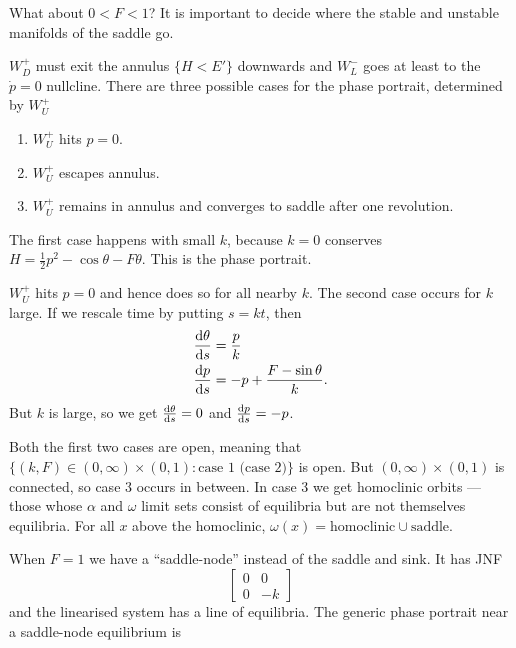 \documentclass{notes}
\theoremstyle{plain}
\begin{document}
What about $0 < F < 1$?  It is important to decide where the stable and
unstable manifolds of the saddle go.

\vspace*{2in}

$W_D^+$ must exit the annulus $\{ H < E' \}$ downwards and $W_L^-$
goes at least to the $\dot{p} = 0$ nullcline.  There are three possible
cases for the phase portrait, determined by $W_U^+$

\begin{enumerate}
\item $W_U^+$ hits $p=0$.
\item $W_U^+$ escapes annulus.
\item $W_U^+$ remains in annulus and converges to saddle after one revolution.
\end{enumerate}

\newpage

The first case happens with small $k$, because $k=0$ conserves
$H= \frac{1}{2} p^2 - \cos \theta -F \theta$.  This is the phase portrait.
\vspace{2in}

$W_U^+$ hits $p=0$ and hence does so for all nearby $k$.  The
second case occurs for $k$ large.  If we rescale time by putting $s = k t$,
then
\begin{align*}
\frac{\mathrm{d}\theta}{\mathrm{d} s} &= \frac{p}{k} \\
\frac{\mathrm{d} p}{\mathrm{d} s} &= -p + \frac{F - \sin \theta}{k}.
\end{align*}
But $k$ is large, so we get $\frac{\mathrm{d}\theta}{\mathrm{d} s} = 0$ and
$\frac{\mathrm{d} p}{\mathrm{d} s} = -p$.

Both the first two cases are open, meaning that
$\{ (k,F) \in (0,\infty) \times (0,1) : \text{case 1 (case 2)}\}$ is open.  But
$(0,\infty) \times (0,1)$ is connected, so case 3 occurs in between.  In case 3
we get homoclinic orbits --- those whose $\alpha$ and $\omega$ limit sets
consist of equilibria but are not themselves equilibria.  For all $x$ above
the homoclinic, $\omega(x) = \text{homoclinic} \cup \text{saddle}$.

When $F = 1$ we have a ``saddle-node'' instead of the saddle and sink.
It has JNF
\[
\left[
\begin{matrix}
0 & 0 \\ 0 & -k 
\end{matrix}
\right]
\]
and the linearised system has a line of equilibria.  The generic phase
portrait near a saddle-node equilibrium is
\vspace{2.5in}
\end{document}
